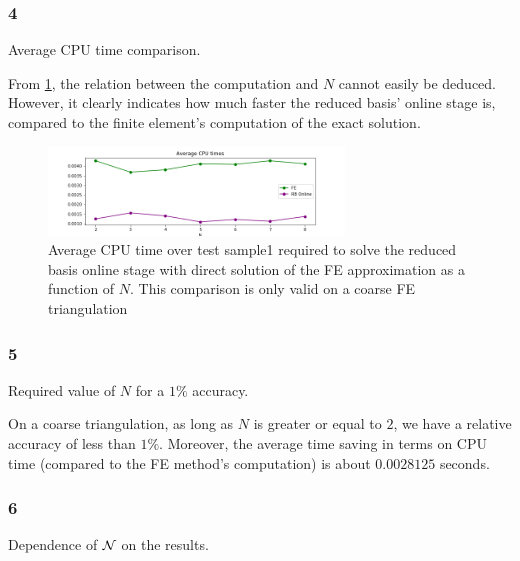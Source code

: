 \documentclass[
	english,
	11pt, %
]{fphw}
\begin{document}
\subsubsection*{4}
\begin{problem}
	Average CPU time comparison.
\end{problem}


From \cref{fig:sample1Times}, the relation between the computation and $N$ cannot easily be deduced. However, it clearly indicates how much faster the reduced basis' online stage is, compared to the finite element's computation of the exact solution. 

\begin{figure}[H]
	\centering
	\includegraphics[width=0.7\textwidth]{sample1Time.png}
	\caption{Average CPU time over test sample1 required to solve the reduced basis online stage with direct solution of the FE approximation as a function of $N$. This comparison is only valid on a coarse FE triangulation}
	\label{fig:sample1Times}
\end{figure}


\subsubsection*{5}
\begin{problem}
	Required value of $N$ for a $1\%$ accuracy.
\end{problem}

On a coarse triangulation, as long as $N$ is greater or equal to $2$, we have a relative accuracy of less than $1\%$. Moreover, the average time saving in terms on CPU time (compared to the FE method's computation) is about \textbf{$0.0028125$} seconds.


\subsubsection*{6}
\begin{problem}
	Dependence of $\cal{N}$ on the results.
\end{problem}
\end{document}

